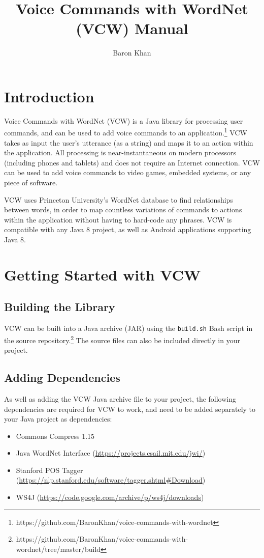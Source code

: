 \documentclass{article}
\title{Voice Commands with WordNet (VCW) Manual}
\author{Baron Khan}
\begin{document}
\maketitle
\tableofcontents

\section{Introduction} 
Voice Commands with WordNet (VCW) is a Java library for processing user commands, and can be used to add voice commands to an application.\footnote{https://github.com/BaronKhan/voice-commands-with-wordnet} VCW takes as input the user's utterance (as a string) and maps it to an action within the application. All processing is near-instantaneous on modern processors (including phones and tablets) and does not require an Internet connection. VCW can be used to add voice commands to video games, embedded systems, or any piece of software.

VCW uses Princeton University's WordNet database to find relationships between words, in order to map countless variations of commands to actions within the application without having to hard-code any phrases. VCW is compatible with any Java 8 project, as well as Android applications supporting Java 8.

\section{Getting Started with VCW} 
\subsection{Building the Library}

VCW can be built into a Java archive (JAR) using the \texttt{build.sh} Bash script in the source repository.\footnote{https://github.com/BaronKhan/voice-commands-with-wordnet/tree/master/build} The source files can also be included directly in your project.

\subsection{Adding Dependencies}

As well as adding the VCW Java archive file to your project, the following dependencies are required for VCW to work, and need to be added separately to your Java project as dependencies:

\begin{itemize}
\item Commons Compress 1.15
\item Java WordNet Interface (\url{https://projects.csail.mit.edu/jwi/})
\item Stanford POS Tagger (\url{https://nlp.stanford.edu/software/tagger.shtml#Download})
\item WS4J (\url{https://code.google.com/archive/p/ws4j/downloads})
\end{itemize}
\end{document}
